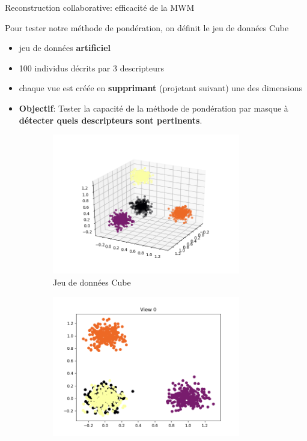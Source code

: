 \documentclass[hyperref={pdfpagelabels=false}]{beamer}
\begin{document}
    \begin{frame}{Reconstruction collaborative: efficacité de la MWM}

        Pour tester notre méthode de pondération, on définit le jeu de données 
        Cube
        \begin{itemize}
            \item jeu de données \textbf{artificiel}
            \item 100 individus décrits par 
                3 descripteurs
            \item chaque vue est créée en \textbf{supprimant} (projetant 
                suivant) une des dimensions
            \item \textbf{Objectif}: Tester la capacité de la méthode de 
                pondération par masque à \textbf{détecter quels descripteurs 
                sont pertinents}.
        \end{itemize}
        \begin{figure}[h]
            \centering
            \begin{subfigure}[h]{0.24\textwidth}
                \centering
                \includegraphics[width=0.9\textwidth]{data}
                \caption{Jeu de données Cube}
            \end{subfigure}
            \begin{subfigure}[h]{0.24\textwidth}
                \centering
                \includegraphics[width=0.9\textwidth]{projection0}

\end{subfigure}
\end{figure}
\end{frame}
\end{document}
